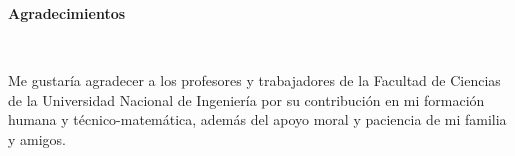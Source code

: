 \begin{agradecimientos}
	\vspace{50 mm}
	\normalsize\textbf{Agradecimientos}

	\

	Me gustaría agradecer a los profesores y trabajadores de la
	Facultad de Ciencias de la Universidad Nacional de Ingeniería por
	su contribución en mi formación humana y técnico-matemática,
	además del apoyo moral y paciencia de mi familia y amigos.
\end{agradecimientos}
